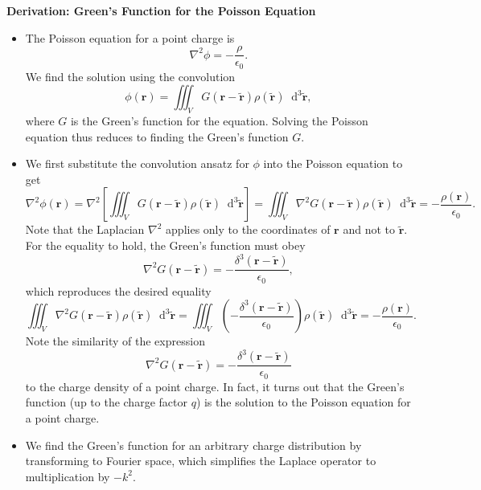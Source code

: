 \documentclass[11pt, a4paper]{article}
\newcommand{\diff}{\mathop{}\!\mathrm{d}} %
\newcommand{\dtr}{\diff^{3} \tilde{\r}}  %
\renewcommand{\vec}[1]{\bm{#1}} %
\renewcommand{\t}[1]{\tilde{#1}} %
\renewcommand{\r}{\vec{r}}
\newcommand{\ee}{\epsilon_{0}}  %
\renewcommand{\laplacian}{\nabla^{2}}
\begin{document}
\textbf{Derivation: Green's Function for the Poisson Equation}
\begin{itemize}
	\item The Poisson equation for a point charge is
	\begin{equation*}
		\laplacian \phi = - \frac{\rho}{\ee}.
	\end{equation*}
	We find the solution using the convolution
	\begin{equation*}
		\phi(\r) = \iiint_{V} G(\r - \t{\r})\rho(\t{\r}) \dtr,
	\end{equation*}
	where $ G $ is the Green's function for the equation. Solving the Poisson equation thus reduces to finding the Green's function $ G $.
	
	
	\item We first substitute the convolution ansatz for $ \phi $ into the Poisson equation to get
	\begin{equation*}
		\laplacian \phi(\r) = \laplacian \left[\iiint_{V}  G(\r - \t{\r})\rho(\t{\r}) \dtr \right] = \iiint_{V} \laplacian G(\r - \t{\r})\rho(\t{\r}) \dtr = - \frac{\rho(\r)}{\ee}.
	\end{equation*}
	Note that the Laplacian $ \laplacian $ applies only to the coordinates of $ \r $ and not to $ \t{\r} $. For the equality to hold, the Green's function must obey
	\begin{equation*}
		\laplacian G(\r - \t{\r}) = -\frac{\delta^{3}(\r - \t{\r})}{\ee},
	\end{equation*}
	which reproduces the desired equality
	\begin{equation*}
		\iiint_{V} \laplacian G(\r - \t{\r})\rho(\t{\r}) \dtr = \iiint_{V} \left(-\frac{\delta^{3}(\r - \t{\r})}{\ee}\right)\rho(\t{\r}) \dtr =  - \frac{\rho(\r)}{\ee}.
	\end{equation*}
	Note the similarity of the expression
	\begin{equation*}
		\laplacian G(\r - \t{\r}) = -\frac{\delta^{3}(\r - \t{\r})}{\ee}
	\end{equation*}
	to the charge density of a point charge. In fact, it turns out that the Green's function (up to the charge factor $ q $) is the solution to the Poisson equation for a point charge. 
	
	\item We find the Green's function for an arbitrary charge distribution by transforming to Fourier space, which simplifies the Laplace operator to multiplication by $ -k^{2} $.
	

\end{itemize}
\end{document}
